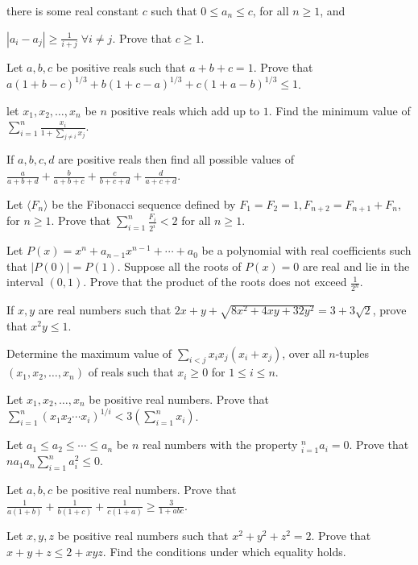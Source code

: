   \startitemize[n]
  \item there is some real constant $c$ such that $0\leq a_n\leq c$, for all $n\geq 1$, and
  \item $|a_i - a_j|\geq \frac{1}{i + j}\;\forall i\neq j$.
  \stopitemize
  Prove that $c\geq 1$.
\item Let $a, b, c$ be positive reals such that $a + b + c = 1$. Prove that $a(1 + b - c)^{1/3} + b(1 + c - a)^{1/3} + c(1 + a -
  b)^{1/3}\leq 1$.
\item let $x_1, x_2, \ldots, x_n$ be $n$ positive reals which add up to $1$. Find the minimum value of $\displaystyle\sum_{i = 1}^n
  \frac{x_i}{1 + \sum_{j\neq i}x_j}$.
\item If $a, b, c, d$ are positive reals then find all possible values of $\frac{a}{a + b + d} + \frac{b}{a + b + c} + \frac{c}{b +
  c + d} + \frac{d}{a + c + d}$.
\item Let $\langle F_n\rangle$ be the Fibonacci sequence defined by $F_1 = F_2 = 1, F_{n + 2} = F_{n + 1} + F_n$, for $n\geq
  1$. Prove that $\displaystyle\sum_{i=1}^n\frac{F_i}{2^i} < 2$ for all $n\geq 1$.
\item Let $P(x) = x^n + a_{n - 1}x^{n - 1} + \cdots + a_0$ be a polynomial with real coefficients such that $|P(0)| =
  P(1)$. Suppose all the roots of $P(x) = 0$ are real and lie in the interval $(0, 1)$. Prove that the product of the roots does
  not exceed $\frac{1}{2^n}$.
\item If $x, y$ are real numbers such that $2x + y + \sqrt{8x^2 + 4xy + 32y^2} = 3 + 3\sqrt{2}$, prove that $x^2y \leq 1$.
\item Determine the maximum value of $\displaystyle\sum_{i < j}x_ix_j(x_i + x_j)$, over all $n$-tuples $(x_1, x_2, \ldots, x_n)$ of
  reals such that $x_i\geq 0$ for $1\leq i\leq n$.
\item Let $x_1, x_2, \ldots, x_n$ be positive real numbers. Prove that $\sum_{i=1}^n(x_1x_2\cdots x_i)^{1/i} <
  3\left(\displaystyle\sum_{i=1}^nx_i\right)$.
\item Let $a_1\leq a_2\leq \cdots\leq a_n$ be $n$ real numbers with the property $\displaystyle_{i=1}^na_i =
  0$. Prove that $na_1a_n\displaystyle\sum_{i=1}^na_i^2\leq 0$.
\item Let $a, b, c$ be positive real numbers. Prove that $\frac{1}{a(1 + b)} + \frac{1}{b(1 + c)} + \frac{1}{c(1 +
  a)}\geq \frac{3}{1 + abc}$.
\item Let $x, y, z$ be positive real numbers such that $x^2 + y^2 + z^2 = 2$. Prove that $x + y + z\leq 2 +
  xyz$. Find the conditions under which equality holds.
